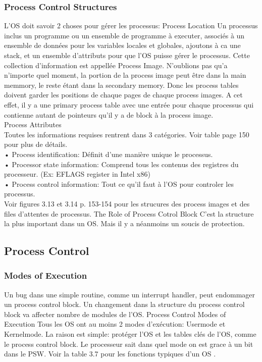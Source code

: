 \subsubsection{Process Control Structures}
L'OS doit savoir 2 choses pour gérer les processus:
Process Location
Un processus inclus un programme ou un ensemble de programme à executer, associés à un ensemble de données pour les variables locales et globales, ajoutons à ca une stack, et un ensemble d'attributs pour que l'OS puisse gérer le processus.
Cette collection d'information est appellée Process Image.
N'oublions pas qu'a n'importe quel moment, la portion de la process image peut être dans la main memmory, le reste étant dans la secondary memory.
Donc les process tables doivent garder les positions de chaque pages de chaque process images.
A cet effet, il y a une primary process table avec une entrée pour chaque processus qui contienne autant de pointeurs qu'il y a de block à la process image. \\
Process Attributes \\
Toutes les informations requises rentrent dans 3 catégories. Voir table page 150 pour plus de détails. \\
• Process identification: Définit d'une manière unique le processus. \\
• Processor state information: Comprend tous les contenus des registres du processeur. (Ex: EFLAGS register in Intel x86) \\
• Process control information: Tout ce qu'il faut à l'OS pour controler les processus. \\
Voir figures 3.13 et 3.14 p. 153-154 pour les strucures des process images et des files d'attentes de processus.
The Role of Process Cotrol Block
C'est la structure la plus important dans un OS. Mais il y a néanmoins un soucis de protection.
\subsection{Process Control}
\subsubsection{Modes of Execution}
Un bug dans une simple routine, comme un interrupt handler, peut endommager un process control block.
Un changement dans la structure du process control block va affecter nombre de modules de l'OS.
Process Control Modes of Execution
Tous les OS ont au moins 2 modes d'exécution: Usermode et Kernelmode. La raison est simple: protéger l'OS et les tables clés de l'OS, comme le process control block. Le processeur sait dans quel mode on est grace à un bit dans le PSW. Voir la table 3.7 pour les fonctions typiques d'un OS \cite[p.~135]{stallings}.
